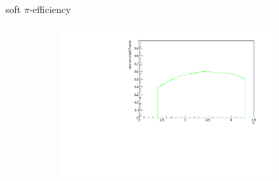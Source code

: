 \documentclass[11pt]{beamer}
\begin{document}
\begin{frame}{soft $\pi$-efficiency}
\begin{figure}
\begin{subfigure}{0.45\textwidth}
\end{subfigure}
\begin{subfigure}{0.45\textwidth}
\includegraphics[width=0.9\textwidth]{up_pdf/single/tot/h_eta_reco_Dst.pdf}
\end{subfigure}
\end{figure}
\end{frame}
\end{document}
